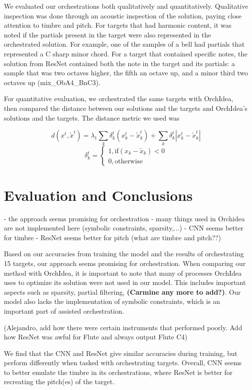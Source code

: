 \documentclass{article}
\begin{document}
We evaluated our orchestrations both qualitatively and quantitatively. Qualitative inspection was done through an acoustic inspection of the solution, paying close attention to timbre and pitch. For targets that had harmonic content, it was noted if the partials present in the target were also represented in the orchestrated solution. For example, one of the samples of a bell had partials that represented a C sharp minor chord. For a target that contained specific notes, the solution from ResNet contained both the note in the target and its partials: a sample that was two octaves higher, the fifth an octave up, and a minor third two octaves up (mix\_ObA4\_BnC3).

For quantitative evaluation, we orchestrated the same targets with OrchIdea, then compared the distance between our solutions and the targets and OrchIdea's solutions and the targets. The distance metric we used was 

$$d(x^t, \tilde{x}^t) =\lambda_1 \sum_k \delta_k^t(x_k^t - \tilde{x}_k^t) + \sum_k \delta_k^t|x_k^t - \tilde{x	}_k^t|$$
$$\delta_k^t = 
\begin{cases}
1, \text{if} (x_k - \tilde{x}_k) < 0 \\
0, \text{otherwise}
\end{cases} $$

\section{Evaluation and Conclusions}
- the approach seems promising for orchestration
- many things used in Orchidea are not implemented here (symbolic constraints, sparsity,...)
- CNN seems better for timbre
- ResNet seems better for pitch (what are timbre and pitch??)

Based on our accuracies from training the model and the results of orchestrating 15 targets, our approach seems promising for orchestration. When comparing our method with OrchIdea, it is important to note that many of processes OrchIdea uses to optimize its solution were not used in our model. This includes important aspects such as sparsity, partial filtering, \textbf{(Carmine any more to add?)}. Our model also lacks the implementation of symbolic constraints, which is an important part of assisted orchestration.

(Alejandro, add how there were certain instruments that performed poorly. Add how ResNet was awful for Flute and always output Flute C4)

We find that the CNN and ResNet give similar accuracies during training, but perform differently when tasked with orchestrating targets. Overall, CNN seems to better emulate the timbre in its orchestrations, where ResNet is better for recreating the pitch(es) of the target. 
\end{document}
